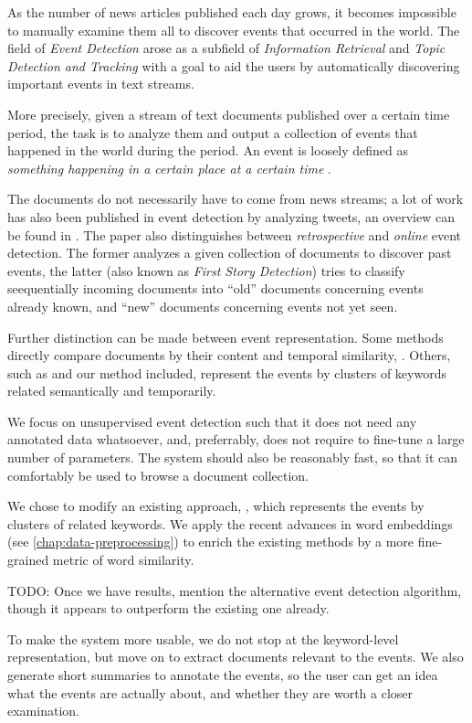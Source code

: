 As the number of news articles published each day grows, it becomes impossible to manually examine them all to discover events that occurred in the world. The field of \textit{Event Detection} arose as a subfield of \textit{Information Retrieval} and \textit{Topic Detection and Tracking} with a goal to aid the users by automatically discovering important events in text streams.

More precisely, given a stream of text documents published over a certain time period, the task is to analyze them and output a collection of events that happened in the world during the period. An event is loosely defined as \textit{something happening in a certain place at a certain time} \cite{retrospective-online-study}.

The documents do not necessarily have to come from news streams; a lot of work has also been published in event detection by analyzing tweets, an overview can be found in \cite{twitter-survey}. The paper also distinguishes between \textit{retrospective} and \textit{online} event detection. The former analyzes a given collection of documents to discover past events, the latter (also known as \textit{First Story Detection}) tries to classify seequentially incoming documents into ``old'' documents concerning events already known, and ``new'' documents concerning events not yet seen.

Further distinction can be made between event representation. Some methods directly compare documents by their content and temporal similarity, \cite{document-bursty-representation}. Others, such as \cite{event-detection, parameter-free} and our method included, represent the events by clusters of keywords related semantically and temporarily.

We focus on unsupervised event detection such that it does not need any annotated data whatsoever, and, preferrably, does not require to fine-tune a large number of parameters. The system should also be reasonably fast, so that it can comfortably be used to browse a document collection.

We chose to modify an existing approach, \cite{event-detection}, which represents the events by clusters of related keywords. We apply the recent advances in word embeddings (see \autoref{chap:data-preprocessing}) to enrich the existing methods by a more fine-grained metric of word similarity.

{\color{red} TODO: Once we have results, mention the alternative event detection algorithm, though it appears to outperform the existing one already.}

To make the system more usable, we do not stop at the keyword-level representation, but move on to extract documents relevant to the events. We also generate short summaries to annotate the events, so the user can get an idea what the events are actually about, and whether they are worth a closer examination.